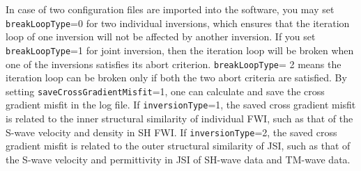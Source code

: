 \documentclass[pdftex,a4paper,parskip,listof=totoc,bibliography=totoc,onehalfspacing,12pt]{scrreprt}
\begin{document}
In case of two configuration files are imported into the software, you may set \verb+breakLoopType+=0 for two individual inversions, which ensures that the iteration loop of one inversion will not be affected by another inversion. If you set \verb+breakLoopType+=1 for joint inversion, then the iteration loop will be broken when one of the inversions satisfies its abort criterion. \verb+breakLoopType+= 2 means the iteration loop can be broken only if both the two abort criteria are satisfied. By setting \verb+saveCrossGradientMisfit+=1, one can calculate and save the cross gradient misfit in the log file. If \verb+inversionType+=1, the saved cross gradient misfit is related to the inner structural similarity of individual FWI, such as that of the S-wave velocity and density in SH FWI. If \verb+inversionType+=2, the saved cross gradient misfit is related to the outer structural similarity of JSI, such as that of the S-wave velocity and permittivity in JSI of SH-wave data and TM-wave data.
\end{document}
